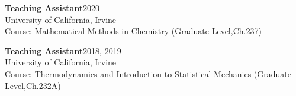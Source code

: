 \documentclass[letterpaper]{article}
\renewenvironment{itemize}{
  \begin{list}{}{
    \setlength{\leftmargin}{1.5em}
  }
}{
  \end{list}
}
\begin{document}
\begin{itemize}
\item \textbf{Teaching Assistant}\hfill 2020\\
      University of California, Irvine\\
		  Course: Mathematical Methods in Chemistry
      (Graduate Level,Ch.237)
\item \textbf{Teaching Assistant}\hfill 2018, 2019\\
      University of California, Irvine\\
		  Course: Thermodynamics and Introduction to Statistical Mechanics
      (Graduate Level,Ch.232A)





\end{itemize}
\end{document}
